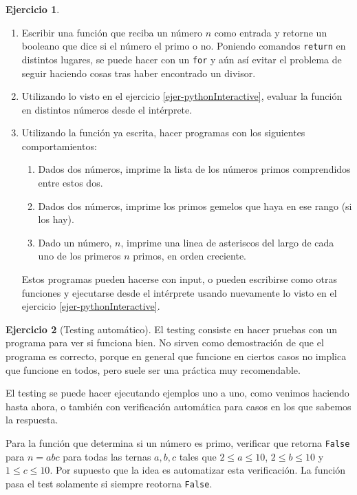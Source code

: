 \documentclass[a4paper,12pt]{book}
\theoremstyle{definition}
\newtheorem{ejercicio}{Ejercicio}
\begin{document}
	\begin{ejercicio}
		\begin{enumerate}
			\item Escribir una función que reciba un número $n$ como entrada y retorne un booleano que dice si el número el primo o no. Poniendo comandos {\tt return} en distintos lugares, se puede hacer con un {\tt for} y aún así evitar el problema de seguir haciendo cosas tras haber encontrado un divisor.
			\item Utilizando lo visto en el ejercicio \ref{ejer-pythonInteractive}, evaluar la función en distintos números desde el intérprete.
			\item Utilizando la función ya escrita, hacer programas con los siguientes comportamientos:
			\begin{enumerate}
				\item Dados dos números, imprime la lista de los números primos comprendidos entre estos dos.
				\item Dados dos números, imprime los primos gemelos que haya en ese rango (si los hay).
				\item Dado un número, $n$, imprime una linea de asteriscos del largo de cada uno de los primeros $n$ primos, en orden creciente.
			\end{enumerate}
			Estos programas pueden hacerse con input, o pueden escribirse como otras funciones y ejecutarse desde el intérprete usando nuevamente lo visto en el ejercicio \ref{ejer-pythonInteractive}.
		\end{enumerate}
	\end{ejercicio}
	\begin{ejercicio}[Testing automático]
		El testing consiste en hacer pruebas con un programa para ver si funciona bien. No sirven como demostración de que el programa es correcto, porque en general que funcione en ciertos casos no implica que funcione en todos, pero suele ser una práctica muy recomendable.
		
		El testing se puede hacer ejecutando ejemplos uno a uno, como venimos haciendo hasta ahora, o también con verificación automática para casos en los que sabemos la respuesta.
		
		Para la función que determina si un número es primo, verificar que retorna {\tt False} para $n=abc$ para todas las ternas $a,b,c$ tales que $2\leq a\leq 10$, $2\leq b\leq 10$ y $1\leq c\leq 10$. Por supuesto que la idea es automatizar esta verificación. La función pasa el test solamente si siempre reotorna {\tt False}.
	\end{ejercicio}
\end{document}
